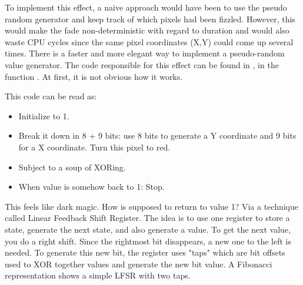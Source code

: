 To implement this effect, a naive approach would have been to use the pseudo random generator  and keep track of which pixels had been fizzled. However, this would make the fade non-deterministic with regard to duration and would also waste CPU cycles since the same pixel coordinates (X,Y) could come up several times. There is a faster and more elegant way to implement a pseudo-random value generator. The code responsible for this effect can be found in , in the function . At first, it is not obvious how it works.\\
\par
\begin{minipage}{\textwidth}

\end{minipage}
\par
This code can be read as:\\
\begin{itemize}
\item Initialize  to 1.
\item Break it down in 8 + 9 bits: use 8 bits to generate a Y coordinate and 9 bits for a X coordinate. Turn this pixel to red.
\item Subject  to a soup of XORing.
\item When  value is somehow back to 1: Stop.
\end{itemize}        
This feels like dark magic. How is  supposed to return to value 1? Via a technique called Linear Feedback Shift Register. The idea is to use one register to store a state, generate the next state, and also generate a value. To get the next value, you do a right shift. Since the rightmost bit disappears, a new one to the left is needed. To generate this new bit, the register uses "taps" which are bit offsets used to XOR together values and generate the new bit value. A Fibonacci representation shows a simple LFSR with two taps.\\
\par

